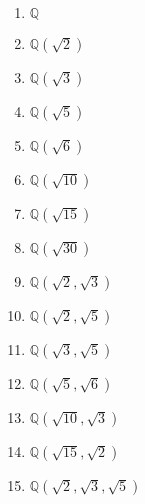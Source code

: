 \documentclass[12pt, letterpaper]{article}
\newcommand{\Q}{\mathbb{Q}}
\begin{document}
\begin{enumerate}
	\begin{enumerate}
		\item $\Q	$
		\item $\Q(\sqrt{2})$
		\item $\Q(\sqrt{3})$
		\item $\Q(\sqrt{5})$
		\item $\Q(\sqrt{6})$
		\item $\Q(\sqrt{10})$
		\item $\Q(\sqrt{15})$
		\item $\Q(\sqrt{30})$
		\item $\Q(\sqrt{2},\sqrt{3})$
		\item $\Q(\sqrt{2},\sqrt{5})$
		\item $\Q(\sqrt{3},\sqrt{5})$
		\item $\Q(\sqrt{5},\sqrt{6})$
		\item $\Q(\sqrt{10},\sqrt{3})$
		\item $\Q(\sqrt{15},\sqrt{2})$
		\item $\Q(\sqrt{2},\sqrt{3},\sqrt{5})$
	\end{enumerate}
\end{enumerate}
\end{document}
